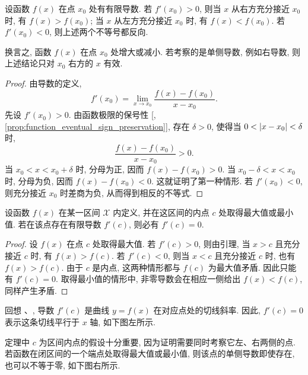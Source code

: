 \begin{lemma}\label{lem:derivative_sign_local_behavior}
设函数 $f(x)$ 在点 $x_0$ 处有有限导数.
若 $f'(x_0)>0$, 则当 $x$ 从右方充分接近 $x_0$ 时, 有 $f(x)>f(x_0)$;
当 $x$ 从左方充分接近 $x_0$ 时, 有 $f(x)<f(x_0)$.
若 $f'(x_0)<0$, 则上述两个不等号都反向.
\end{lemma}

换言之, 函数 $f(x)$ 在点 $x_0$ 处增大或减小.
若考察的是单侧导数, 例如右导数, 则上述结论只对 $x_0$ 右方的 $x$ 有效.

\begin{proof}
由导数的定义,
$$
f'(x_0)=\lim_{x\to x_0}\frac{f(x)-f(x_0)}{x-x_0}.
$$
先设 $f'(x_0)>0$.
由函数极限的保号性
[, \ref{prop:function_eventual_sign_preservation}],
存在 $\delta>0$, 使得当 $0<\left| x-x_0 \right|<\delta$ 时,
$$
\frac{f(x)-f(x_0)}{x-x_0}>0.
$$
当 $x_0<x<x_0+\delta$ 时, 分母为正, 因而 $f(x)-f(x_0)>0$.
当 $x_0-\delta<x<x_0$ 时, 分母为负, 因而 $f(x)-f(x_0)<0$.
这就证明了第一种情形.
若 $f'(x_0)<0$, 则充分接近 $x_0$ 时差商为负, 从而得到相反的不等式.
\end{proof}

\begin{theorem}[Fermat]\label{thm:fermat_stationary_point}
设函数 $f(x)$ 在某一区间 $\mathcal{X}$ 内定义, 并在这区间的内点 $c$ 处取得最大值或最小值.
若在该点存在有限导数 $f'(c)$, 则必有 $f'(c)=0$.
\end{theorem}

\begin{proof}
设 $f(x)$ 在点 $c$ 处取得最大值.
若 $f'(c)>0$, 则由引理, 当 $x>c$ 且充分接近 $c$ 时, 有 $f(x)>f(c)$.
若 $f'(c)<0$, 则当 $x<c$ 且充分接近 $c$ 时, 也有 $f(x)>f(c)$.
由于 $c$ 是内点, 这两种情形都与 $f(c)$ 为最大值矛盾.
因此只能有 $f'(c)=0$.
取得最小值的情形中, 非零导数会在相应一侧给出 $f(x)<f(c)$, 同样产生矛盾.
\end{proof}

回想 、, 导数 $f'(c)$ 是曲线 $y=f(x)$ 在对应点处的切线斜率.
因此, $f'(c)=0$ 表示这条切线平行于 $x$ 轴, 如下图左所示.

定理中 $c$ 为区间内点的假设十分重要, 因为证明需要同时考察它左、右两侧的点.
若函数在闭区间的一个端点处取得最大值或最小值, 则该点的单侧导数即使存在, 也可以不等于零, 如下图右所示.

